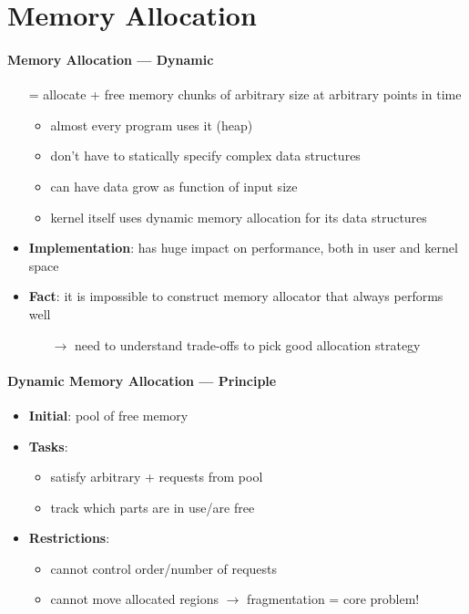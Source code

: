\section{Memory Allocation}

\paragraph{Memory Allocation --- Dynamic}
\begin{itemize}
  \item[=] allocate + free memory chunks of arbitrary size at arbitrary points in time
  \begin{itemize}
    \item almost every program uses it (heap)
    \item don't have to statically specify complex data structures
    \item can have data grow as function of input size
    \item kernel itself uses dynamic memory allocation for its data structures
  \end{itemize}
  \item \textbf{Implementation}: has huge impact on performance, both in user and kernel space
  \item \textbf{Fact}: it is impossible to construct memory allocator that always performs well
  \begin{itemize}
    \item[$ \to $] need to understand trade-offs to pick good allocation strategy
  \end{itemize}
\end{itemize}

\paragraph{Dynamic Memory Allocation --- Principle}
\begin{itemize}
  \item \textbf{Initial}: pool of free memory
  \item \textbf{Tasks}:
  \begin{itemize}
    \item satisfy arbitrary  +  requests from pool
    \item track which parts are in use/are free
  \end{itemize}
  \item \textbf{Restrictions}:
  \begin{itemize}
    \item cannot control order/number of requests
    \item cannot move allocated regions $ \to $ fragmentation = core problem!
  \end{itemize}
\end{itemize}

